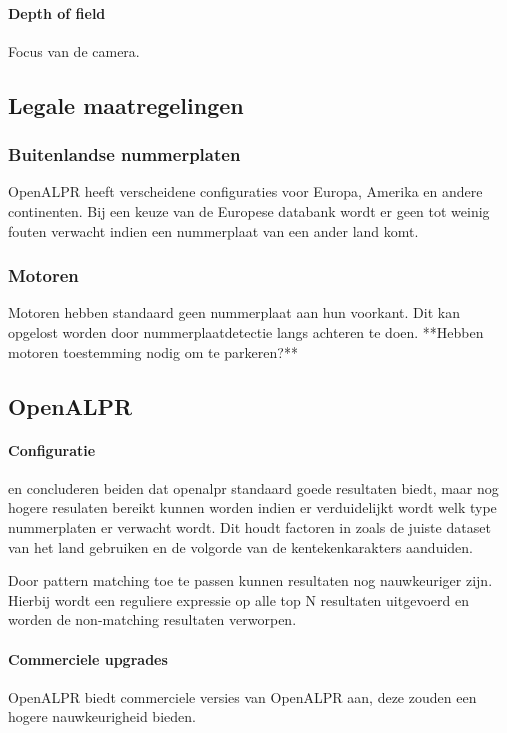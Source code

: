 \paragraph{Depth of field}
Focus van de camera.

\subsection{Legale maatregelingen}
\subsubsection{Buitenlandse nummerplaten}
OpenALPR heeft verscheidene configuraties voor Europa, Amerika en andere continenten. Bij een keuze van de Europese databank wordt er geen tot weinig fouten verwacht indien een nummerplaat van een ander land komt.

\subsubsection{Motoren}
Motoren hebben standaard geen nummerplaat aan hun voorkant. Dit kan opgelost worden door nummerplaatdetectie langs achteren te doen.
**Hebben motoren toestemming nodig om te parkeren?**

\subsection{OpenALPR}

\paragraph{Configuratie}
\textcite{arrieta2019prototype} en \textcite{buhus2016automatic} concluderen beiden dat openalpr standaard goede resultaten biedt, maar nog hogere resulaten bereikt kunnen worden indien er verduidelijkt wordt welk type nummerplaten er verwacht wordt. Dit houdt factoren in zoals de juiste dataset van het land gebruiken en de volgorde van de kentekenkarakters aanduiden.

Door pattern matching toe te passen kunnen resultaten nog nauwkeuriger zijn. Hierbij wordt een reguliere expressie op alle top N resultaten uitgevoerd en worden de non-matching resultaten verworpen.

\paragraph{Commerciele upgrades}
OpenALPR biedt commerciele versies van OpenALPR aan, deze zouden een hogere nauwkeurigheid bieden.

